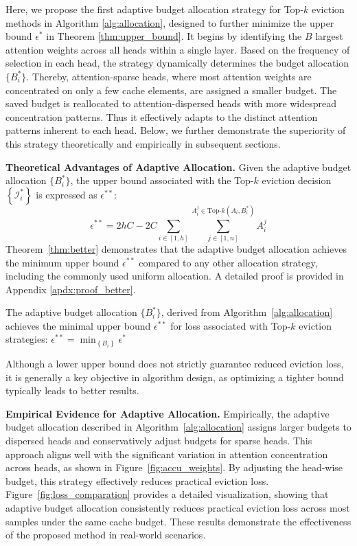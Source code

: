 Here, we propose the first adaptive budget allocation strategy for Top-$k$ eviction methods in Algorithm \ref{alg:allocation}, designed to further minimize the upper bound $\epsilon^*$ in Theorem \ref{thm:upper_bound}.
It begins by identifying the $B$ largest attention weights across all heads within a single layer. Based on the frequency of  selection in each head, the strategy dynamically determines the  budget allocation $ \{ B^*_i \} $. Thereby, attention-sparse heads, where most attention weights are concentrated on only a few cache elements, are assigned a smaller budget. The saved budget is  reallocated to attention-dispersed heads with more widespread concentration patterns. Thus it effectively adapts to the distinct attention patterns inherent to each head. Below, we further demonstrate the superiority of this strategy theoretically and empirically in subsequent sections.







\textbf{Theoretical Advantages of Adaptive Allocation.}
Given the adaptive budget allocation  $\{ B^*_i\}$, the upper bound associated with the Top-$k$ eviction decision $\left\{\mathcal{I}_i^* \right\}$  is expressed as  $\epsilon^{**}$:
\begin{equation}
	\epsilon^{**}=  2hC - 2C\sum_{i\in [1, h]}\sum_{j \in [1, n]}^{A_i^j \in \text{Top-$k$}(A_i,B^*_i)} A_i^j
\end{equation}
Theorem~\ref{thm:better} demonstrates that the adaptive budget allocation achieves the minimum upper bound  $\epsilon^{**}$  compared to any other allocation strategy, including the commonly used uniform allocation.  A detailed proof is provided in Appendix \ref{apdx:proof_better}.
\begin{theorem}
	\label{thm:better}
	The adaptive budget allocation  $\{ B^*_i\}$, derived from Algorithm~\ref{alg:allocation} achieves the minimal upper bound $\epsilon^{**}$ for loss associated with Top-$k$ eviction strategies:
		$
			\epsilon^{**} = \min_{\left\{B_i\right\}} \epsilon^{*}
	$
	\vspace{-0.2cm}
\end{theorem}
Although a lower upper bound does not strictly guarantee reduced eviction loss, it is generally a key objective in algorithm design, as optimizing a tighter bound typically leads to better results.



\textbf{Empirical Evidence for Adaptive Allocation.}
Empirically, the adaptive budget allocation described in Algorithm~\ref{alg:allocation} assigns larger budgets to dispersed heads and conservatively adjust budgets for sparse heads. This approach aligns well with the significant variation in attention concentration across heads, as shown in Figure~\ref{fig:accu_weights}.  By adjusting the head-wise budget, this strategy effectively reduces practical eviction loss. Figure~\ref{fig:loss_comparation} provides a detailed visualization, showing that adaptive budget allocation consistently reduces practical eviction loss across most samples under the same cache budget. These results demonstrate the effectiveness of the proposed method in real-world scenarios.




